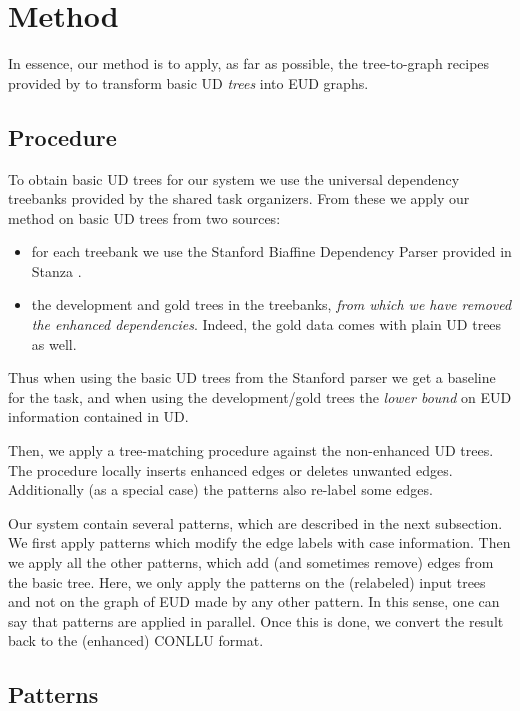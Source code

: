 \documentclass[11pt,a4paper]{article}
\begin{document}
\section{Method}
In essence, our method is to apply, as far as possible, the
tree-to-graph recipes provided by \citet{schuster2016enhanced} to
transform basic UD \emph{trees} into EUD graphs.

\subsection{Procedure} 
To obtain basic UD trees for our system we use the universal
dependency treebanks provided by the shared task organizers. From
these we apply our method on basic UD trees from two sources:

\begin{itemize}
\item for each treebank we use the Stanford Biaffine Dependency
Parser \citep{dozat2016deep} provided in Stanza
\citep{qi2020stanza}.
\item the development and gold trees in the treebanks, \emph{from
    which we have removed the enhanced dependencies}. Indeed, the gold
  data comes with plain UD trees as well.
\end{itemize}

Thus when using the basic UD trees from the Stanford parser we get a
baseline for the task, and when using the development/gold trees the
\emph{lower bound} on EUD information contained in UD.

%
Then, we apply a tree-matching procedure against the non-enhanced UD
trees. The procedure locally inserts enhanced edges or deletes unwanted
edges. Additionally (as a special case) the patterns also re-label some edges.

Our system contain several patterns, which are described in the next
subsection. We first apply patterns which modify
the edge labels with case information. Then we apply all the other
patterns, which add (and sometimes remove) edges from the basic
tree. Here, we only apply the patterns on the (relabeled) input trees
and not on the graph of EUD made by any other pattern. In this sense,
one can say that patterns are applied in parallel.
%
Once this is done, we convert the result back to the
(enhanced) CONLLU format.

\subsection{Patterns}
\end{document}
